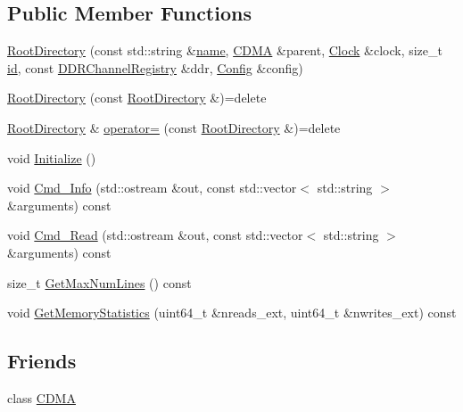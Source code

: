 \subsection*{Public Member Functions}
\begin{DoxyCompactItemize}
\item 
\hyperlink{class_simulator_1_1_c_d_m_a_1_1_root_directory_a73a9740b23319f7a01d5d2de6f1f37bb}{Root\+Directory} (const std\+::string \&\hyperlink{mtconf_8c_a8f8f80d37794cde9472343e4487ba3eb}{name}, \hyperlink{class_simulator_1_1_c_d_m_a}{C\+D\+M\+A} \&parent, \hyperlink{class_simulator_1_1_clock}{Clock} \&clock, size\+\_\+t \hyperlink{mtconf_8c_aa3185401f04d30bd505daebf48c39cc5}{id}, const \hyperlink{class_simulator_1_1_d_d_r_channel_registry}{D\+D\+R\+Channel\+Registry} \&ddr, \hyperlink{class_config}{Config} \&config)
\item 
\hyperlink{class_simulator_1_1_c_d_m_a_1_1_root_directory_ae8ab21eca82819518d6c09b7bda21d29}{Root\+Directory} (const \hyperlink{class_simulator_1_1_c_d_m_a_1_1_root_directory}{Root\+Directory} \&)=delete
\item 
\hyperlink{class_simulator_1_1_c_d_m_a_1_1_root_directory}{Root\+Directory} \& \hyperlink{class_simulator_1_1_c_d_m_a_1_1_root_directory_af5cb75c63f84a1d8c990a164b66eaebc}{operator=} (const \hyperlink{class_simulator_1_1_c_d_m_a_1_1_root_directory}{Root\+Directory} \&)=delete
\item 
void \hyperlink{class_simulator_1_1_c_d_m_a_1_1_root_directory_afc85eee93daa53d2df9dced6c5d7c83c}{Initialize} ()
\item 
void \hyperlink{class_simulator_1_1_c_d_m_a_1_1_root_directory_aa2fab98759e782db370ce410c80df8fa}{Cmd\+\_\+\+Info} (std\+::ostream \&out, const std\+::vector$<$ std\+::string $>$ \&arguments) const 
\item 
void \hyperlink{class_simulator_1_1_c_d_m_a_1_1_root_directory_a5820cbcd28feccc409102e0b1c60c8a2}{Cmd\+\_\+\+Read} (std\+::ostream \&out, const std\+::vector$<$ std\+::string $>$ \&arguments) const 
\item 
size\+\_\+t \hyperlink{class_simulator_1_1_c_d_m_a_1_1_root_directory_a1f99f51d930acbee8d8067c0ffa62316}{Get\+Max\+Num\+Lines} () const 
\item 
void \hyperlink{class_simulator_1_1_c_d_m_a_1_1_root_directory_a7ac44ab2531825b00887568e525d75dd}{Get\+Memory\+Statistics} (uint64\+\_\+t \&nreads\+\_\+ext, uint64\+\_\+t \&nwrites\+\_\+ext) const 
\end{DoxyCompactItemize}
\subsection*{Friends}
\begin{DoxyCompactItemize}
\item 
class \hyperlink{class_simulator_1_1_c_d_m_a_1_1_root_directory_add415c7c29b0f2d422db4e084c6688e3}{C\+D\+M\+A}
\end{DoxyCompactItemize}

